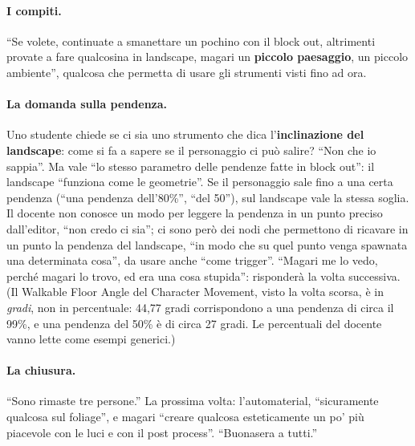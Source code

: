 \paragraph{I compiti.} ``Se volete, continuate a smanettare un pochino con il block out,
altrimenti provate a fare qualcosina in landscape, magari un \textbf{piccolo paesaggio}, un
piccolo ambiente'', qualcosa che permetta di usare gli strumenti visti fino ad ora.

\paragraph{La domanda sulla pendenza.} Uno studente chiede se ci sia uno strumento che dica
l'\textbf{inclinazione del landscape}: come si fa a sapere se il personaggio ci può salire?
``Non che io sappia''. Ma vale ``lo stesso parametro delle pendenze fatte in block out'': il
landscape ``funziona come le geometrie''. Se il personaggio sale fino a una certa pendenza
(``una pendenza dell'80\%'', ``del 50''), sul landscape vale la stessa soglia. Il docente non
conosce un modo per leggere la pendenza in un punto preciso dall'editor, ``non credo ci
sia''; ci sono però dei nodi che permettono di ricavare in un punto la pendenza del
landscape, ``in modo che su quel punto venga spawnata una determinata cosa'', da usare
anche ``come trigger''. ``Magari me lo vedo, perché magari lo trovo, ed era una cosa stupida'':
risponderà la volta successiva. (Il Walkable Floor Angle del Character Movement, visto la
volta scorsa, è in \emph{gradi}, non in percentuale: 44,77 gradi corrispondono a una
pendenza di circa il 99\%, e una pendenza del 50\% è di circa 27 gradi. Le percentuali del
docente vanno lette come esempi generici.)

\paragraph{La chiusura.} ``Sono rimaste tre persone.'' La prossima volta: l'automaterial,
``sicuramente qualcosa sul foliage'', e magari ``creare qualcosa esteticamente un po' più
piacevole con le luci e con il post process''. ``Buonasera a tutti.''

